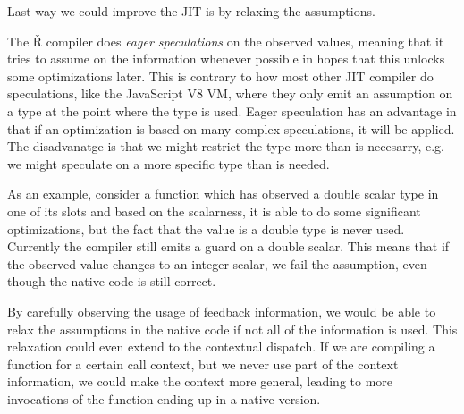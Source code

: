 Last way we could improve the JIT is by relaxing the assumptions.

The Ř compiler does \textit{eager speculations} on the observed values, meaning that it tries to assume on the information whenever possible in hopes that this unlocks some optimizations later. This is contrary to how most other JIT compiler do speculations, like the JavaScript V8 VM\todocite, where they only emit an assumption on a type at the point where the type is used. Eager speculation has an advantage in that if an optimization is based on many complex speculations, it will be applied. The disadvanatge is that we might restrict the type more than is necesarry, e.g. we might speculate on a more specific type than is needed.

As an example, consider a function which has observed a double scalar type in one of its slots and based on the scalarness, it is able to do some significant optimizations, but the fact that the value is a double type is never used. Currently the compiler still emits a guard on a double scalar. This means that if the observed value changes to an integer scalar, we fail the assumption, even though the native code is still correct. 

By carefully observing the usage of feedback information, we would be able to relax the assumptions in the native code if not all of the information is used. This relaxation could even extend to the contextual dispatch. If we are compiling a function for a certain call context, but we never use part of the context information, we could make the context more general, leading to more invocations of the function ending up in a native version.

